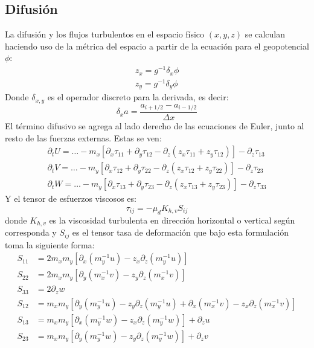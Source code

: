 \subsection{Difusión}
La difusión y los flujos turbulentos en el espacio físico $(x,y,z)$ se calculan haciendo uso de la métrica del espacio a partir de la ecuación para el geopotencial $\phi$:
\begin{eqnarray}
z_x=g^{-1}\delta_x\phi \\
z_y=g^{-1}\delta_y\phi
\end{eqnarray}
Donde $\delta_{x,y}$ es el operador discreto para la derivada, es decir:
\begin{equation}
\delta_x a = \frac{a_{i+1/2}-a_{i-1/2}}{\Delta x}
\end{equation}
El término difusivo se agrega al lado derecho de las ecuaciones de Euler, junto al resto de las fuerzas externas. Estas se ven:
\begin{eqnarray}
\partial_t U = \ldots - m_x[\partial_x\tau_{11}+\partial_y\tau_{12}-\partial_z(z_x\tau_{11}+z_y\tau_{12})]-\partial_z\tau_{13} \\
\partial_t V = \ldots - m_y[\partial_x\tau_{12}+\partial_y\tau_{22}-\partial_z(z_x\tau_{12}+z_y\tau_{22})]-\partial_z\tau_{23} \\
\partial_t W = \ldots - m_y[\partial_x\tau_{13}+\partial_y\tau_{23}-\partial_z(z_x\tau_{13}+z_y\tau_{23})]-\partial_z\tau_{33}
\end{eqnarray}
Y el tensor de esfuerzos viscosos es:
\begin{equation}
\tau_{ij} = -\mu_d K_{h,v}S_{ij}
\end{equation}
donde $K_{h,v}$ es la viscosidad turbulenta en dirección horizontal o vertical según corresponda y $S_{ij}$ es el tensor tasa de deformación que bajo esta formulación toma la siguiente forma:
\begin{align}
S_{11} &= 2m_xm_y[\partial_x(m_y^{-1}u)-z_x\partial_z(m_y^{-1}u)]  \\
S_{22} &= 2m_xm_y[\partial_y(m_x^{-1}v)-z_y\partial_z(m_x^{-1}v)]  \\
S_{33} &= 2\partial_z w  \\
S_{12} &= m_xm_y[\partial_y(m_y^{-1}u)-z_y\partial_z(m_y^{-1}u)+\partial_x(m_x^{-1}v)-z_x\partial_z(m_x^{-1}v)]  \\
S_{13} &= m_xm_y[\partial_x(m_y^{-1}w)-z_x\partial_z(m_y^{-1}w)]+\partial_z u  \\
S_{23} &= m_xm_y[\partial_y(m_y^{-1}w)-z_y\partial_z(m_y^{-1}w)]+\partial_z v  \\%
\end{align}

